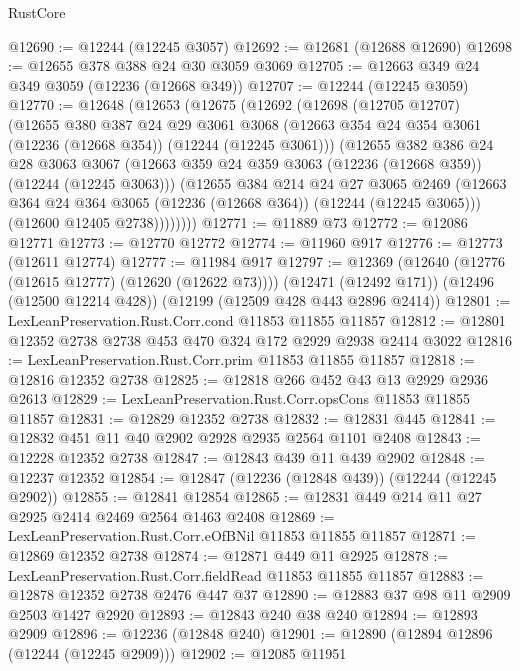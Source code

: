 \begin{lexlean}{RustCore}
\begin{coremodule}
@12690 := @12244 (@12245 @3057)
@12692 := @12681 (@12688 @12690)
@12698 := @12655 @378 @388 @24 @30 @3059 @3069
@12705 := @12663 @349 @24 @349 @3059 (@12236 (@12668 @349))
@12707 := @12244 (@12245 @3059)
@12770 := @12648
    (@12653
      (@12675
        (@12692
          (@12698
            (@12705 @12707)
            (@12655
              @380
              @387
              @24
              @29
              @3061
              @3068
              (@12663 @354 @24 @354 @3061 (@12236 (@12668 @354)) (@12244 (@12245 @3061)))
              (@12655
                @382
                @386
                @24
                @28
                @3063
                @3067
                (@12663 @359 @24 @359 @3063 (@12236 (@12668 @359)) (@12244 (@12245 @3063)))
                (@12655
                  @384
                  @214
                  @24
                  @27
                  @3065
                  @2469
                  (@12663 @364 @24 @364 @3065 (@12236 (@12668 @364)) (@12244 (@12245 @3065)))
                  (@12600 @12405 @2738))))))))
@12771 := @11889 @73
@12772 := @12086 @12771
@12773 := @12770 @12772
@12774 := @11960 @917
@12776 := @12773 (@12611 @12774)
@12777 := @11984 @917
@12797 := @12369
    (@12640 (@12776 (@12615 @12777) (@12620 (@12622 @73))))
    (@12471 (@12492 @171))
    (@12496 (@12500 @12214 @428))
    (@12199 (@12509 @428 @443 @2896 @2414))
@12801 := LexLeanPreservation.Rust.Corr.cond @11853 @11855 @11857
@12812 := @12801 @12352 @2738 @2738 @453 @470 @324 @172 @2929 @2938 @2414 @3022
@12816 := LexLeanPreservation.Rust.Corr.prim @11853 @11855 @11857
@12818 := @12816 @12352 @2738
@12825 := @12818 @266 @452 @43 @13 @2929 @2936 @2613
@12829 := LexLeanPreservation.Rust.Corr.opsCons @11853 @11855 @11857
@12831 := @12829 @12352 @2738
@12832 := @12831 @445
@12841 := @12832 @451 @11 @40 @2902 @2928 @2935 @2564 @1101 @2408
@12843 := @12228 @12352 @2738
@12847 := @12843 @439 @11 @439 @2902
@12848 := @12237 @12352
@12854 := @12847 (@12236 (@12848 @439)) (@12244 (@12245 @2902))
@12855 := @12841 @12854
@12865 := @12831 @449 @214 @11 @27 @2925 @2414 @2469 @2564 @1463 @2408
@12869 := LexLeanPreservation.Rust.Corr.eOfBNil @11853 @11855 @11857
@12871 := @12869 @12352 @2738
@12874 := @12871 @449 @11 @2925
@12878 := LexLeanPreservation.Rust.Corr.fieldRead @11853 @11855 @11857
@12883 := @12878 @12352 @2738 @2476 @447 @37
@12890 := @12883 @37 @98 @11 @2909 @2503 @1427 @2920
@12893 := @12843 @240 @38 @240
@12894 := @12893 @2909
@12896 := @12236 (@12848 @240)
@12901 := @12890 (@12894 @12896 (@12244 (@12245 @2909)))
@12902 := @12085 @11951

\end{coremodule}
\end{lexlean}

